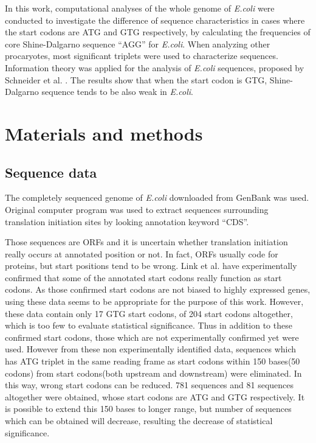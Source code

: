 In this work, computational analyses of the whole genome of {\it E.coli}
were conducted to investigate the difference of sequence characteristics
in cases where the start codons are ATG and GTG respectively, by
calculating the frequencies of core Shine-Dalgarno sequence ``AGG'' for
{\it E.coli}. When analyzing other procaryotes, most significant
triplets were used to characterize sequences.  Information theory was
applied for the analysis of {\it E.coli} sequences, proposed by
Schneider et al.  \cite{label11,arclabelts200}. The results show that
when the start codon is GTG, Shine-Dalgarno sequence tends to be also
weak in {\it E.coli}.

\section{Materials and methods}
\subsection{Sequence data}

The completely sequenced genome of {\it E.coli}\cite{label1065}
downloaded from GenBank was used. Original computer program was used to
extract sequences surrounding translation initiation sites by looking
annotation keyword ``CDS''.

Those sequences are ORFs and it is uncertain whether translation
initiation really occurs at annotated position or not. In fact, ORFs
usually code for proteins, but start positions tend to be wrong. Link
et al.\cite{lts14} have experimentally confirmed that some of the
annotated start codons really function as start codons.  As those
confirmed start codons are not biased to highly expressed genes, using
these data seems to be appropriate for the purpose of this
work. However, these data contain only 17 GTG start codons, of 204
start codons altogether, which is too few to evaluate statistical
significance. Thus in addition to these confirmed start codons, those
which are not experimentally confirmed yet were used. However from
these non experimentally identified data, sequences which has ATG
triplet in the same reading frame as start codons within 150 bases(50
codons) from start codons(both upstream and downstream) were
eliminated. In this way, wrong start codons can be reduced. 781
sequences and 81 sequences altogether were obtained, whose start
codons are ATG and GTG respectively. It is possible to extend this 150
bases to longer range, but number of sequences which can be obtained
will decrease, resulting the decrease of statistical significance.

